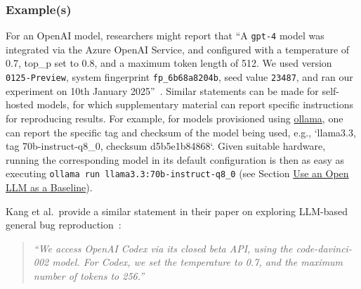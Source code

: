 
\subsubsection{Example(s)}

For an OpenAI model, researchers might report that ``A  \texttt{gpt-4} model was integrated via the Azure OpenAI Service, and configured with a temperature of 0.7, top\_p set to 0.8, and a maximum token length of 512. We used version \texttt{0125-Preview}, system fingerprint \texttt{fp\_6b68a8204b}, seed value \texttt{23487}, and ran our experiment on 10th January 2025''~\cite{OpenAI25, Azure25}.
Similar statements can be made for self-hosted models, for which supplementary material can report specific instructions for reproducing results.
For example, for models provisioned using \href{https://ollama.com/library/}{ollama}, one can report the specific tag and checksum of the model being used, e.g., `llama3.3, tag 70b-instruct-q8\_0, checksum d5b5e1b84868`.
Given suitable hardware, running the corresponding model in its default configuration is then as easy as executing \texttt{ollama run llama3.3:70b-instruct-q8\_0} (see Section \href{/guidelines/#use-an-open-llm-as-a-baseline}{Use an Open LLM as a Baseline}).

Kang et al.~provide a similar statement in their paper on exploring LLM-based general bug reproduction~\cite{DBLP:conf/icse/KangYY23}:

\begin{quote}
\it
``We access OpenAI Codex via its closed beta API, using the code-davinci-002 model. For Codex, we set the temperature to 0.7, and the maximum number of tokens to 256.''
\end{quote}

